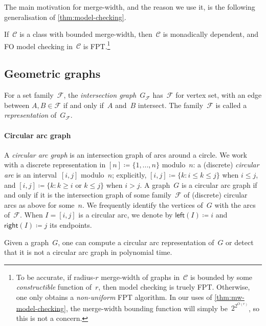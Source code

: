 \documentclass[a4paper,UKenglish,cleveref,thm-restate]{lipics-v2021}
\theoremstyle{remark}
\newcommand{\eqdef}{\coloneqq}
\newcommand{\Fc}{\mathcal{F}}
\newcommand{\Cc}{\mathcal{C}}
\newcommand{\Lend}{\mathsf{left}}
\newcommand{\Rend}{\mathsf{right}}
\begin{document}
The main motivation for merge-width, and the reason we use it, is the following generalisation of \cref{thm:model-checking}.
\begin{theorem}\label{thm:mw-model-checking}
    If~$\Cc$ is a class with bounded merge-width, then~$\Cc$ is monadically dependent, and FO model checking in~$\Cc$ is FPT.\footnote{%
        To be accurate, if radius-$r$ merge-width of graphs in~$\Cc$ is bounded by some \emph{constructible} function of~$r$,
        then model checking is truely FPT.
        Otherwise, one only obtains a \emph{non-uniform} FPT algorithm.
        In our uses of \cref{thm:mw-model-checking}, the merge-width bounding function will simply be~$2^{2^{O(r)}}$, so this is not a concern.
    }
\end{theorem}


\subsection{Geometric graphs}\label{sec:prelim:geom}
For a set family~$\Fc$, the \emph{intersection graph}~$G_\Fc$ has~$\Fc$ for vertex set, with an edge between $A,B \in \Fc$ if and only if~$A$ and~$B$ intersect. The family~$\Fc$ is called a \emph{representation} of~$G_\Fc$.

\paragraph*{Circular arc graph}
A \emph{circular arc graph} is an intersection graph of arcs around a circle.
We work with a discrete representation in $[n] \eqdef \{1,...,n\}$ modulo~$n$:
a (discrete) \emph{circular arc} is an interval~$[i,j]$ modulo~$n$;
explicitly, $[i,j] \eqdef \{k: i \le k \le j\}$ when $i \le j$, and $[i,j] \eqdef \{k : k \ge i \text{ or } k \le j\}$ when $i > j$.
A graph~$G$ is a circular arc graph if and only if it is the intersection graph of some family~$\Fc$ of (discrete) circular arcs as above for some~$n$.
We frequently identify the vertices of~$G$ with the arcs of~$\Fc$.
When $I = [i,j]$ is a circular arc, we denote by $\Lend(I) \eqdef i$ and $\Rend(I) \eqdef j$ its endpoints.

\begin{theorem}\label{thm:cag-detection}
    Given a graph~$G$, one can compute a circular arc representation of~$G$ or detect that it is not a circular arc graph in polynomial time.
\end{theorem}
\end{document}
